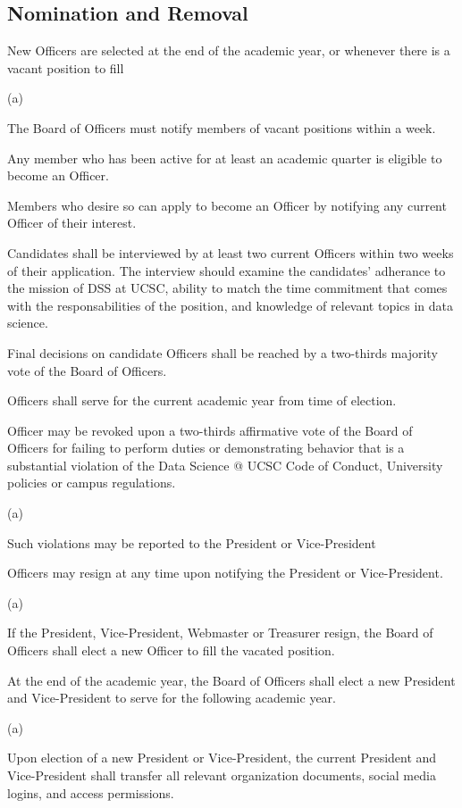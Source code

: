 \documentclass{article}
\newcommand{\SubItem}[1]{
    {\setlength\itemindent{15pt} \item[] #1}
}
\begin{document}
\subsection{Nomination and Removal}
\begin{itemize}
    \item[1.] New Officers are selected at the end of the academic year, or 
    whenever there is a vacant position to fill 
        \SubItem{(a)} The Board of Officers must notify members of vacant positions 
        within a week. 
    \item[2.] Any member who has been active for at least an academic quarter is eligible to 
    become an Officer.
    \item[3.] Members who desire so can apply to become an Officer by notifying any current 
    Officer of their interest.  
    \item[4.] Candidates shall be interviewed by at least two current Officers within two 
    weeks of their application. The interview should examine the candidates' adherance  
    to the mission of DSS at UCSC, ability to match the time commitment that comes with 
    the responsabilities of the position, and knowledge of relevant topics in data science.
    \item[5.] Final decisions on candidate Officers shall be reached by a two-thirds majority 
    vote of the Board of Officers.
    \item[6.] Officers shall serve for the current academic year from time of election.
    \item[7.] Officer may be revoked upon a two-thirds affirmative vote of the Board of 
    Officers for failing to perform duties or demonstrating behavior 
    that is a substantial violation of the Data Science @ UCSC Code of Conduct,
     University policies or campus regulations.
        \SubItem{(a)} Such violations may be reported to the President or Vice-President
    \item[8.] Officers may resign at any time upon notifying the President or Vice-President.
        \SubItem{(a)} If the President, Vice-President, Webmaster or Treasurer resign, the Board of Officers shall elect a new Officer to fill the vacated position.  
    \item[9.] %
    \item[10.] At the end of the academic year, the Board of Officers shall elect a new 
    President and Vice-President to serve for the following academic year. 
        \SubItem{(a)}  Upon election of a new President or Vice-President, the current 
        President and Vice-President shall transfer all relevant organization documents, 
        social media logins, and access permissions. 
\end{itemize}
\end{document}
